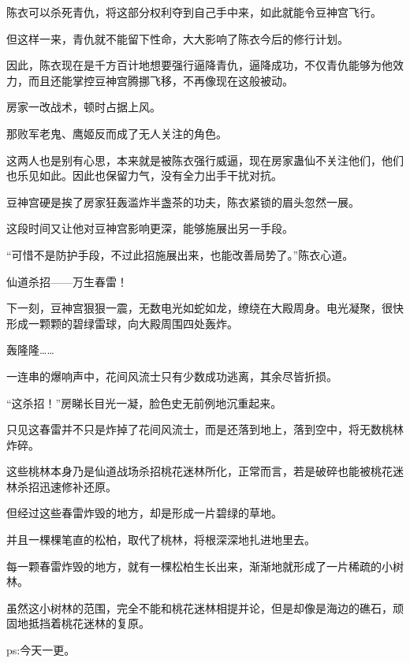 \begin{this_body}
陈衣可以杀死青仇，将这部分权利夺到自己手中来，如此就能令豆神宫飞行。

但这样一来，青仇就不能留下性命，大大影响了陈衣今后的修行计划。

因此，陈衣现在是千方百计地想要强行逼降青仇，逼降成功，不仅青仇能够为他效力，而且还能掌控豆神宫腾挪飞移，不再像现在这般被动。

房家一改战术，顿时占据上风。

那败军老鬼、鹰姬反而成了无人关注的角色。

这两人也是别有心思，本来就是被陈衣强行威逼，现在房家蛊仙不关注他们，他们也乐见如此。因此也保留力气，没有全力出手干扰对抗。

豆神宫硬是挨了房家狂轰滥炸半盏茶的功夫，陈衣紧锁的眉头忽然一展。

这段时间又让他对豆神宫影响更深，能够施展出另一手段。

“可惜不是防护手段，不过此招施展出来，也能改善局势了。”陈衣心道。

仙道杀招——万生春雷！

下一刻，豆神宫狠狠一震，无数电光如蛇如龙，缭绕在大殿周身。电光凝聚，很快形成一颗颗的碧绿雷球，向大殿周围四处轰炸。

轰隆隆……

一连串的爆响声中，花间风流士只有少数成功逃离，其余尽皆折损。

“这杀招！”房睇长目光一凝，脸色史无前例地沉重起来。

只见这春雷并不只是炸掉了花间风流士，而是还落到地上，落到空中，将无数桃林炸碎。

这些桃林本身乃是仙道战场杀招桃花迷林所化，正常而言，若是破碎也能被桃花迷林杀招迅速修补还原。

但经过这些春雷炸毁的地方，却是形成一片碧绿的草地。

并且一棵棵笔直的松柏，取代了桃林，将根深深地扎进地里去。

每一颗春雷炸毁的地方，就有一棵松柏生长出来，渐渐地就形成了一片稀疏的小树林。

虽然这小树林的范围，完全不能和桃花迷林相提并论，但是却像是海边的礁石，顽固地抵挡着桃花迷林的复原。

ps:今天一更。

\end{this_body}


